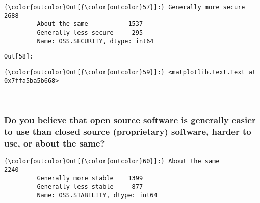 \documentclass[11pt]{article}
\begin{document}
            \begin{Verbatim}[commandchars=\\\{\}]
{\color{outcolor}Out[{\color{outcolor}57}]:} Generally more secure    2688
         About the same           1537
         Generally less secure     295
         Name: OSS.SECURITY, dtype: int64
\end{Verbatim}
        
\texttt{\color{outcolor}Out[{\color{outcolor}58}]:}
    

    


            \begin{Verbatim}[commandchars=\\\{\}]
{\color{outcolor}Out[{\color{outcolor}59}]:} <matplotlib.text.Text at 0x7ffa5ba5b668>
\end{Verbatim}
        
    \begin{center}
    \end{center}
    { \hspace*{\fill} \\}
    
    \subsubsection{Do you believe that open source software is generally
easier to use than closed source (proprietary) software, harder to use,
or about the
same?}\label{do-you-believe-that-open-source-software-is-generally-easier-to-use-than-closed-source-proprietary-software-harder-to-use-or-about-the-same}


            \begin{Verbatim}[commandchars=\\\{\}]
{\color{outcolor}Out[{\color{outcolor}60}]:} About the same           2240
         Generally more stable    1399
         Generally less stable     877
         Name: OSS.STABILITY, dtype: int64
\end{Verbatim}
        
\end{document}
